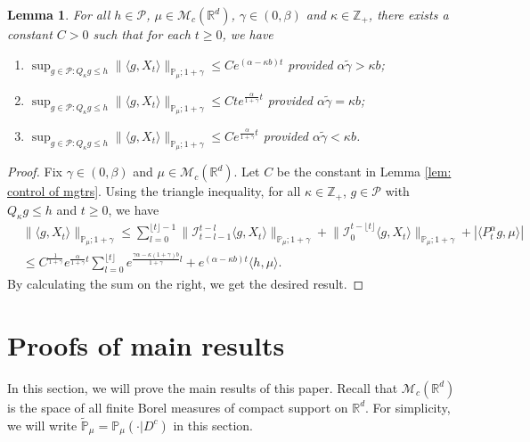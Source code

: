\documentclass[12pt,a4paper]{amsart}
\theoremstyle{plain}
\newtheorem{lem}[thm]{Lemma}
\theoremstyle{definition}
\numberwithin{equation}{section}
\begin{document}
\begin{lem}
  \label{lem:P:M:uc}
  For all $h \in \mathcal P$, $\mu \in \mathcal M_c(\mathbb R^d)$, $\gamma\in (0, \beta)$ and $\kappa \in \mathbb Z_+$, there exists a constant $C > 0$ such that for each $t\geq 0$, we have
  \begin{enumerate}
  \item
    \label{item:P:M:uc:1}
    $\sup_{g\in \mathcal P: Q_\kappa g \leq h}\|\langle g,X_t\rangle\|_{\mathbb{P}_{\mu};1+\gamma}\leq C e^{(\alpha-\kappa b)t}$ provided $\alpha \tilde \gamma > \kappa b$;
  \item
    \label{item:P:M:uc:2}
    $\sup_{g\in \mathcal P: Q_\kappa g \leq h}\|\langle g,X_t\rangle\|_{\mathbb{P}_{\mu};1+\gamma}\leq C te^{\frac{\alpha}{1+\gamma}t}$ provided $\alpha \tilde \gamma = \kappa b$;
  \item
    \label{item:P:M:uc:3}
    $\sup_{g\in \mathcal P: Q_\kappa g \leq h} \|\langle g,X_t\rangle\|_{\mathbb{P}_{\mu};1+\gamma}\leq C e^{\frac{\alpha}{1+\gamma}t}$ provided $\alpha \tilde \gamma < \kappa b$.
  \end{enumerate}
\end{lem}

\begin{proof}
  Fix $\gamma \in (0,\beta)$ and $\mu \in \mathcal M_c(\mathbb R^d)$.
  Let $C$ be the constant in Lemma \ref{lem: control of mgtrs}.
  Using the triangle inequality, for all $\kappa\in \mathbb Z_+$, $g \in \mathcal P$ with $Q_\kappa g \leq h$ and $t\geq 0$, we have
  \begin{align}
    & \|\langle g,X_t\rangle\|_{\mathbb P_\mu;1+\gamma}
      \leq \sum_{l=0}^{\lfloor t\rfloor - 1}\big\| \mathcal{I}_{t-l-1}^{t-l}\langle g,X_t\rangle \big\|_{\mathbb P_\mu;1+\gamma}+\big\| \mathcal{I}_{0}^{t-\lfloor t \rfloor}\langle g,X_t\rangle  \big\|_{\mathbb P_\mu;1+\gamma} + |\langle P^\alpha_t g,\mu\rangle| \\
    & \leq C^{\frac{1}{1+\gamma}} e^{\frac{\alpha}{1+\gamma}t} \sum_{l=0}^{\lfloor t\rfloor} e^{\frac{\gamma\alpha-\kappa (1+\gamma)b}{1+\gamma} l} + e^{(\alpha - \kappa b)t} \langle h,\mu\rangle.
  \end{align}
  By calculating the sum on the right, we get the desired result.
\end{proof}

\section{Proofs of main results}
\label{proofs of main results}
In this section, we will prove the main results of this paper. Recall that $\mathcal{M}_c(\mathbb{R}^d)$ is the space of all finite Borel measures of compact support on $\mathbb{R}^d$.
For simplicity, we will write $\mathbb{\widetilde{P}}_{\mu}=\mathbb{P}_{\mu}(\cdot|D^c)$ in this section.
\end{document}
